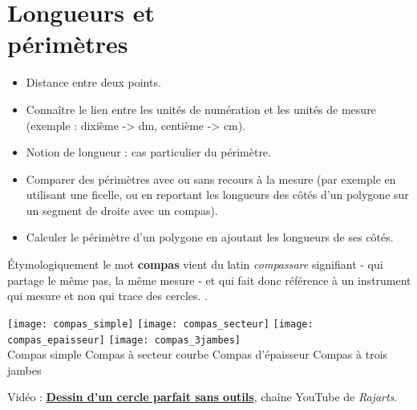 \themaM
\graphicspath{{../Ch8_Longueurs_et_perimetre/Images/}}

\chapter{Longueurs et\\périmètres}
\label{C07}

\begin{prerequis}
   \begin{itemize}
      \item Distance entre deux points.
      \item Connaître le lien entre les unités de numération et les unités de mesure (exemple : dixième -> dm, centième -> cm).
      \item Notion de longueur : cas particulier du périmètre.
      \item Comparer des périmètres avec ou sans recours à la mesure (par exemple en utilisant une ficelle, ou en reportant les longueurs des côtés d’un polygone sur un segment de droite avec un compas).
      \item Calculer le périmètre d’un polygone en ajoutant les longueurs de ses côtés.
   \end{itemize}
\end{prerequis}

\vfill

\begin{debat}
   Étymologiquement le mot {\bf compas} vient du latin {\it compassare} signifiant - qui partage le même pas, la même mesure - et qui fait donc référence à un instrument qui mesure et non qui trace des cercles.
   . \\
   \begin{center}
      \small
      \texttt{[image: compas\_simple]}
      \qquad
      \texttt{[image: compas\_secteur]}
      \qquad
      \texttt{[image: compas\_epaisseur]}
      \qquad
      \texttt{[image: compas\_3jambes]} \\
      Compas simple \quad Compas à secteur courbe \; Compas d'épaisseur \quad Compas à trois jambes
   \end{center}
   \bigskip
   \begin{cadre}[B2][F4]
      \begin{center}
         Vidéo : \href{https://www.youtube.com/watch?v=gXOW4e708Hs&vl=fr}{\bf Dessin d'un cercle parfait sans outils}, chaîne YouTube de {\it Rajarts}.      \end{center}
   \end{cadre}
\end{debat}

